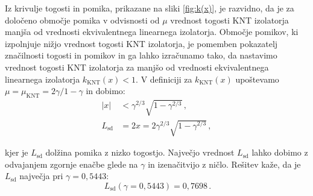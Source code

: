         Iz krivulje togosti in pomika, prikazane na sliki \ref{fig:k(x)}, je razvidno, da je za določeno območje pomika v odvisnosti od $\mu$ vrednost togosti KNT izolatorja manjša od vrednosti ekvivalentnega linearnega izolatorja. Območje pomikov, ki izpolnjuje nižjo vrednost togosti KNT izolatorja, je pomemben pokazatelj značilnosti togosti in pomikov in ga lahko izračunamo tako, da nastavimo vrednost togosti KNT izolatorja za manjšo od vrednosti ekvivalentnega linearnega izolatorja $k_{\mathrm{KNT}}(x)<1$. V definiciji za $k_{\mathrm{KNT}}(x)$ upoštevamo $\mu=\mu_{\mathrm{KNT}}=2\gamma/1-\gamma$ in dobimo:
        \begin{align}
            |x|&<\gamma^{2 / 3} \sqrt{1-\gamma^{2 / 3}} \,, \\
            L_{\mathrm{sd}}&=2 x=2 \gamma^{2 / 3} \sqrt{1-\gamma^{2 / 3}} \,,
        \end{align}
        
        kjer je $L_\mathrm{sd}$ dolžina pomika z nizko togostjo.  Največjo vrednost $L_\mathrm{sd}$ lahko dobimo z odvajanjem zgornje enačbe glede na $\gamma$ in izenačitvijo z ničlo. Rešitev kaže, da je $L_\mathrm{sd}$ največja pri $\gamma = 0,5443$:
        \begin{equation}
        \   L_{\mathrm{sd}}(\gamma=0,5443)=0,7698\,.
        \end{equation}
        
        
        
        
    
        
        
        
    